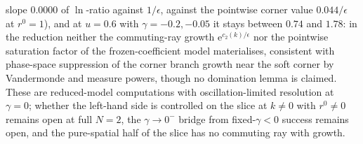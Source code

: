 slope \(0.0000\) of \(\ln\)-ratio against \(1/\epsilon\), against the pointwise corner value \(0.044/\epsilon\) at \(r^0=1\)), and at \(u=0.6\) with \(\gamma=-0.2,-0.05\) it stays between \(0.74\) and \(1.78\): in the reduction neither the commuting-ray growth \(\mathrm e^{c_2(k)/\epsilon}\) nor the pointwise saturation factor of the frozen-coefficient model materialises, consistent with phase-space suppression of the corner branch growth near the soft corner by Vandermonde and measure powers, though no domination lemma is claimed. These are reduced-model computations with oscillation-limited resolution at \(\gamma=0\); whether the left-hand side is controlled on the slice at \(k\ne0\) with \(r^0\ne0\) remains open at full \(N=2\), the \(\gamma\to0^-\) bridge from fixed-\(\gamma<0\) success remains open, and the pure-spatial half of the slice has no commuting ray with growth.
